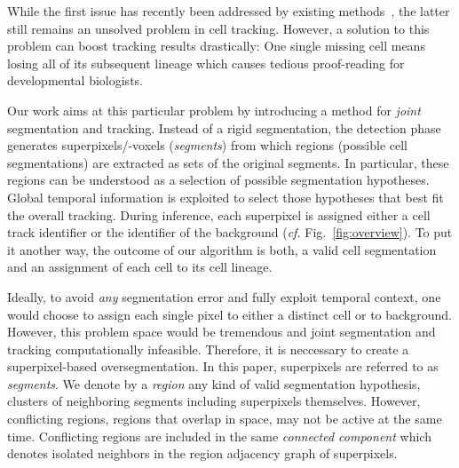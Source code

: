 \documentclass[10pt,twocolumn,letterpaper]{article}
\begin{document}
While the first issue has recently been addressed by existing
methods~\cite{schiegg_13_conservation}, the latter still remains an unsolved problem in cell
tracking. However, a solution to this problem can boost tracking results drastically: One single
missing cell means losing all of its subsequent lineage which causes tedious proof-reading for
developmental biologists. 

Our work aims at this particular problem by introducing a method for \emph{joint} segmentation and
tracking. Instead of a rigid segmentation, the detection phase generates superpixels/-voxels (\emph{segments})
from which regions (possible cell segmentations)
are extracted as sets of the original segments. 
In particular, these regions can be understood as a
selection of possible segmentation hypotheses. %
Global temporal information is exploited to select those hypotheses that best fit the overall
tracking. %
During inference, each superpixel is assigned either a cell track identifier or the identifier of 
the background (\emph{cf.} Fig.~\ref{fig:overview}). To put it another way, the outcome of our algorithm is both, a valid cell segmentation and 
an assignment of each cell to its cell lineage.

Ideally, to avoid \emph{any} segmentation error and fully exploit temporal context, one would
choose to assign each single pixel to either a distinct cell or to background. 
However, this problem space would be tremendous and
joint segmentation and tracking computationally infeasible. Therefore, it is
neccessary to create a superpixel-based oversegmentation. 
In this paper, superpixels are referred to
as \emph{segments}. %
We denote by a \emph{region} 
any kind of valid
segmentation hypothesis, \ie %
clusters of neighboring segments including superpixels themselves.
However, conflicting regions, \ie regions that overlap in space, 
may not be active at the same time. Conflicting regions are included in the same 
\emph{connected component} which denotes isolated neighbors in the region adjacency
graph of superpixels. 
\end{document}
